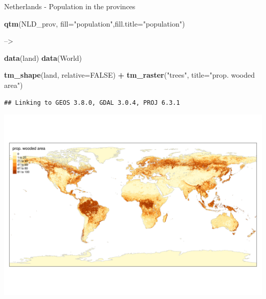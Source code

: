 \documentclass[
  ignorenonframetext,
]{beamer}
\newenvironment{Shaded}{\begin{snugshade}}{\end{snugshade}}
\newcommand{\DataTypeTok}[1]{\textcolor[rgb]{0.13,0.29,0.53}{#1}}
\newcommand{\KeywordTok}[1]{\textcolor[rgb]{0.13,0.29,0.53}{\textbf{#1}}}
\newcommand{\NormalTok}[1]{#1}
\newcommand{\OperatorTok}[1]{\textcolor[rgb]{0.81,0.36,0.00}{\textbf{#1}}}
\newcommand{\OtherTok}[1]{\textcolor[rgb]{0.56,0.35,0.01}{#1}}
\newcommand{\StringTok}[1]{\textcolor[rgb]{0.31,0.60,0.02}{#1}}
\begin{document}
\begin{frame}[fragile]{Netherlands - Population in the provinces}
\protect\hypertarget{netherlands---population-in-the-provinces}{}
\begin{Shaded}
\begin{Highlighting}[]
\KeywordTok{qtm}\NormalTok{(NLD\_prov, }\DataTypeTok{fill=}\StringTok{"population"}\NormalTok{,}\DataTypeTok{fill.title=}\StringTok{"population"}\NormalTok{) }
\end{Highlighting}
\end{Shaded}

--\textgreater{}

\begin{Shaded}
\begin{Highlighting}[]
\KeywordTok{data}\NormalTok{(land)}
\KeywordTok{data}\NormalTok{(World)}
\end{Highlighting}
\end{Shaded}

\begin{Shaded}
\begin{Highlighting}[]
\KeywordTok{tm\_shape}\NormalTok{(land,  }\DataTypeTok{relative=}\OtherTok{FALSE}\NormalTok{) }\OperatorTok{+}
\StringTok{    }\KeywordTok{tm\_raster}\NormalTok{(}\StringTok{"trees"}\NormalTok{, }\DataTypeTok{title=}\StringTok{"prop. wooded area"}\NormalTok{)}
\end{Highlighting}
\end{Shaded}

\begin{verbatim}
## Linking to GEOS 3.8.0, GDAL 3.0.4, PROJ 6.3.1
\end{verbatim}

\includegraphics{quick_high_quality_maps_files/figure-beamer/unnamed-chunk-20-1.pdf}
\end{frame}
\end{document}
